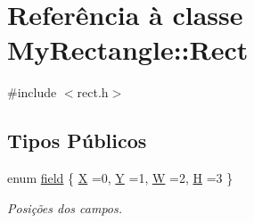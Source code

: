 \hypertarget{classMyRectangle_1_1Rect}{}\section{Referência à classe My\+Rectangle\+:\+:Rect}
\label{classMyRectangle_1_1Rect}


{\ttfamily \#include $<$rect.\+h$>$}

\subsection*{Tipos Públicos}
\begin{DoxyCompactItemize}
\item 
enum \hyperlink{classMyRectangle_1_1Rect_a78ae9cb320d9d52d1ec72a2649af0a65}{field} \{ \hyperlink{classMyRectangle_1_1Rect_a78ae9cb320d9d52d1ec72a2649af0a65a80ca8b14f9e879b877ca47838840ae68}{X} =0, 
\hyperlink{classMyRectangle_1_1Rect_a78ae9cb320d9d52d1ec72a2649af0a65a85ee4fcab8754f655bf212fc8c38b0e0}{Y} =1, 
\hyperlink{classMyRectangle_1_1Rect_a78ae9cb320d9d52d1ec72a2649af0a65a304b62595682fac960a1ebefa0d5db0b}{W} =2, 
\hyperlink{classMyRectangle_1_1Rect_a78ae9cb320d9d52d1ec72a2649af0a65af5a8c9c7138109496e3db289ce464717}{H} =3
 \}\begin{DoxyCompactList}\small\item\em Posi\c{c}\~{o}es dos campos. \end{DoxyCompactList}
\end{DoxyCompactItemize}
